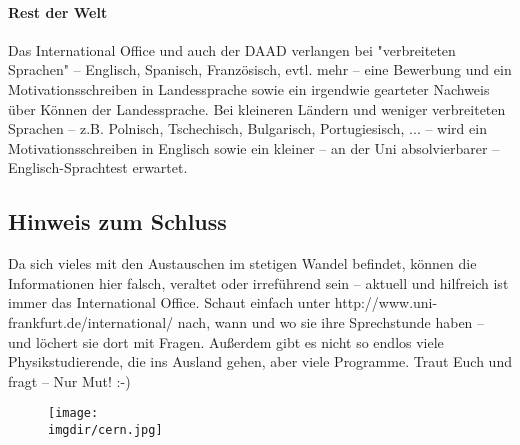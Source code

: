 \paragraph{Rest der Welt}
Das International Office und auch der DAAD verlangen bei "verbreiteten Sprachen" --
Englisch, Spanisch, Französisch, evtl. mehr -- eine Bewerbung und ein Motivationsschreiben in Landessprache
sowie ein irgendwie gearteter Nachweis über Können der Landessprache.
Bei kleineren Ländern und weniger verbreiteten Sprachen --
z.B. Polnisch, Tschechisch, Bulgarisch, Portugiesisch, ... -- wird ein Motivationsschreiben in Englisch sowie ein kleiner -- an der Uni absolvierbarer -- Englisch-Sprachtest erwartet.

\subsection{Hinweis zum Schluss}
Da sich vieles mit den Austauschen im stetigen Wandel befindet, können die Informationen hier falsch, veraltet oder irreführend sein -- aktuell und hilfreich ist immer das International Office.
Schaut einfach unter http://www.uni-frankfurt.de/international/ nach, wann und wo sie ihre Sprechstunde haben -- und löchert sie dort mit Fragen.
Außerdem gibt es nicht so endlos viele Physikstudierende, die ins Ausland gehen, aber viele Programme.
Traut Euch und fragt -- Nur Mut! :-)
\newpage
\begin{figure}[!b]
	\centering
	\texttt{[image: \\imgdir/cern.jpg]}
\end{figure}
